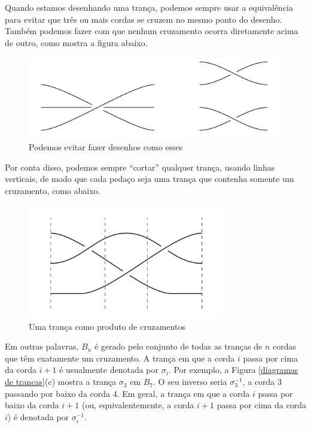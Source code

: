 	Quando estamos desenhando uma trança, podemos sempre usar a equivalência para 
	evitar que três ou mais cordas se cruzem no mesmo ponto do desenho. Também podemos fazer com que 
	nenhum cruzamento ocorra diretamente acima de outro, como mostra a figura abaixo.
	\begin{figure}[H]
		\captionsetup{justification=centering}
		\begin{center}
			\includegraphics[width=12cm]{Images/desenhos_evitaveis.png}
		\end{center}\caption{Podemos evitar fazer desenhos como esses}\label{diagramas indesejaveis}
	\end{figure}
	Por conta disso, podemos sempre ``cortar'' qualquer trança, usando linhas verticais, 
	de modo que cada pedaço seja uma trança que contenha somente um cruzamento, como abaixo.
	\begin{figure}[H]
		\captionsetup{justification=centering}
		\begin{center}
			\includegraphics[width=8.6cm]{Images/fig_18_8.png}
		\end{center}\caption{Uma trança como produto de cruzamentos}\label{cortar trancas}
	\end{figure} 
	Em outras palavras, $B_n$ é gerado pelo conjunto de todas as tranças de $n$ 
	cordas que têm exatamente um cruzamento. A trança em que a corda $i$ passa por cima da corda $i+1$ é 
	usualmente denotada por $\sigma_i$. Por exemplo, a Figura \ref{diagramas de trancas}(c) mostra a trança
	$\sigma_3$ em $B_7$. O seu inverso seria $\sigma_3^{-1}$, a corda 3 passando por baixo da corda 4. 
	Em geral, a trança em que a corda $i$ passa por baixo da corda $i+1$ (ou, equivalentemente, a corda 
	$i+1$ passa por cima da corda $i$) é denotada por $\sigma_i^{-1}$. 
	
